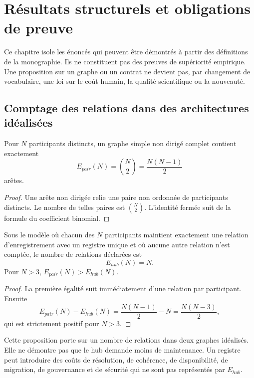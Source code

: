 \chapter{Résultats structurels et obligations de preuve}

Ce chapitre isole les énoncés qui peuvent être démontrés à partir des définitions de la monographie. Ils ne constituent pas des preuves de supériorité empirique. Une proposition sur un graphe ou un contrat ne devient pas, par changement de vocabulaire, une loi sur le coût humain, la qualité scientifique ou la nouveauté.

\section{Comptage des relations dans des architectures idéalisées}

\begin{proposition}
Pour $N$ participants distincts, un graphe simple non dirigé complet contient exactement
\[
E_{pair}(N)=\binom{N}{2}=\frac{N(N-1)}{2}
\]
arêtes.
\end{proposition}

\begin{proof}
Une arête non dirigée relie une paire non ordonnée de participants distincts. Le nombre de telles paires est $\binom{N}{2}$. L'identité fermée suit de la formule du coefficient binomial.
\end{proof}

\begin{proposition}
Sous le modèle où chacun des $N$ participants maintient exactement une relation d'enregistrement avec un registre unique et où aucune autre relation n'est comptée, le nombre de relations déclarées est
\[
E_{hub}(N)=N.
\]
Pour $N>3$, $E_{pair}(N)>E_{hub}(N)$.
\end{proposition}

\begin{proof}
La première égalité suit immédiatement d'une relation par participant. Ensuite
\[
E_{pair}(N)-E_{hub}(N)
=\frac{N(N-1)}2-N
=\frac{N(N-3)}2,
\]
qui est strictement positif pour $N>3$.
\end{proof}

\begin{limitation}
Cette proposition porte sur un nombre de relations dans deux graphes idéalisés. Elle ne démontre pas que le hub demande moins de maintenance. Un registre peut introduire des coûts de résolution, de cohérence, de disponibilité, de migration, de gouvernance et de sécurité qui ne sont pas représentés par $E_{hub}$.
\end{limitation}

